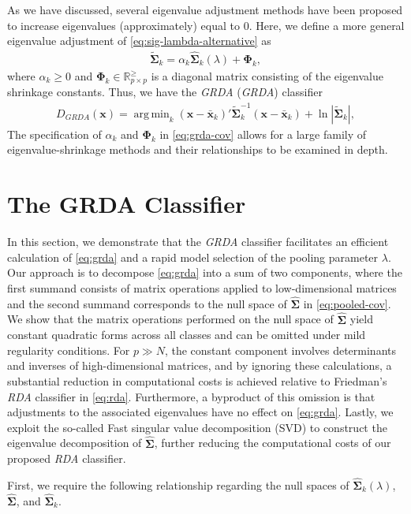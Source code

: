 \documentclass[11pt]{article}
\newcommand{\xbar}{\bar{\bm x}}
\DeclareMathOperator*{\argmin}{arg\,min}
\begin{document}
As we have discussed, several eigenvalue adjustment methods have been proposed to increase eigenvalues (approximately) equal to 0. Here, we define a more general eigenvalue adjustment of \eqref{eq:sig-lambda-alternative} as
\begin{align}
	\tilde{\bm \Sigma}_k = \alpha_k \widehat{\bm \Sigma}_k(\lambda) + \bm \Phi_k,\label{eq:grda-cov}
\end{align}
where $\alpha_k \ge 0$ and $\bm \Phi_k \in \mathbb{R}_{p \times p}^{\ge}$ is a diagonal matrix consisting of the eigenvalue shrinkage constants. Thus, we have the \emph{GRDA} (\emph{GRDA}) classifier
\begin{align}
	D_{GRDA}(\bm x) = \argmin_{k}  (\bm x - \xbar_k)'\tilde{\bm\Sigma}_k^{-1}(\bm x - \xbar_k)  + \ln |\tilde{\bm\Sigma}_k|, \label{eq:grda}
\end{align}
The specification of $\alpha_k$ and $\bm \Phi_k$ in \eqref{eq:grda-cov} allows for a large family of eigenvalue-shrinkage methods and their relationships to be examined in depth.

\section{The GRDA Classifier}
In this section, we demonstrate that the \emph{GRDA} classifier facilitates an efficient calculation of \eqref{eq:grda} and a rapid model selection of the pooling parameter $\lambda$. Our approach is to decompose \eqref{eq:grda} into a sum of two components, where the first summand consists of matrix operations applied to low-dimensional matrices and the second summand corresponds to the null space of $\widehat{\bm \Sigma}$ in \eqref{eq:pooled-cov}. We show that the matrix operations performed on the null space of $\widehat{\bm \Sigma}$ yield constant quadratic forms across all classes and can be omitted under mild regularity conditions. For $p \gg N$, the constant component involves determinants and inverses of high-dimensional matrices, and by ignoring these calculations, a substantial reduction in computational costs is achieved relative to Friedman's \emph{RDA} classifier in \eqref{eq:rda}. Furthermore, a byproduct of this omission is that adjustments to the associated eigenvalues have no effect on \eqref{eq:grda}. Lastly, we exploit the so-called Fast singular value decomposition (SVD) to construct the eigenvalue decomposition of $\widehat{\bm \Sigma}$, further reducing the computational costs of our proposed \emph{RDA} classifier.

First, we require the following relationship regarding the null spaces of $\widehat{\bm \Sigma}_k(\lambda)$, $\widehat{\bm \Sigma}$, and $\widehat{\bm \Sigma}_k$.
\end{document}
